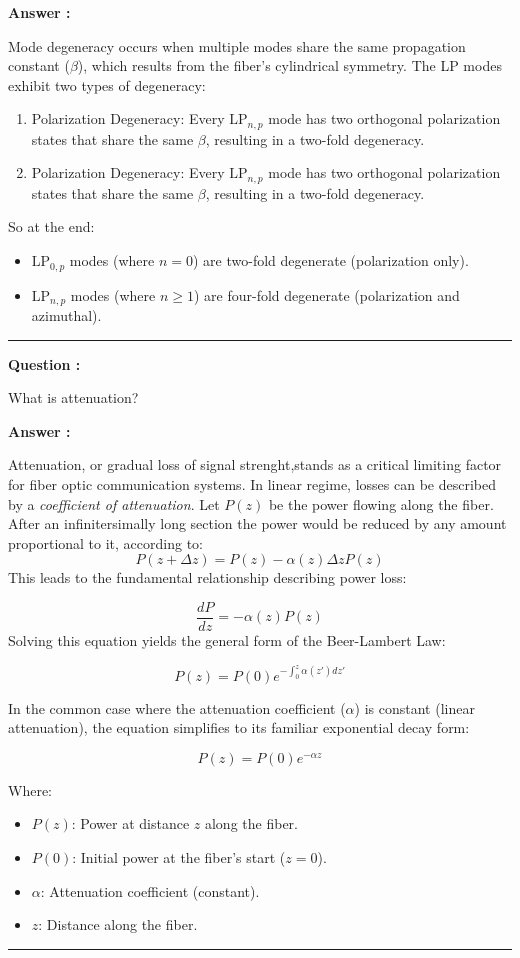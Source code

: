 \documentclass[a4paper,11pt]{book}
\newcounter{qacount}
\newenvironment{question}{
  \refstepcounter{qacount}
  \vspace{1em} %
  \noindent\textbf{Question \theqacount:}\space
}{
  \par %
}
\newenvironment{answer}{
  \noindent\textbf{Answer \theqacount:}\space
}{
  \par\vspace{1em}   %
  \hrule             %
  \vspace{0.5em}     %
}
\begin{document}
\begin{answer}
    Mode degeneracy occurs when multiple modes share the same propagation constant ($\beta$), which results from the fiber's cylindrical symmetry. The LP modes exhibit two types of degeneracy:

    \begin{enumerate}
        \item Polarization Degeneracy: Every $\text{LP}_{n,p}$ mode has two orthogonal polarization states that share the same $\beta$, resulting in a two-fold degeneracy.
        \item Polarization Degeneracy: Every $\text{LP}_{n,p}$ mode has two orthogonal polarization states that share the same $\beta$, resulting in a two-fold degeneracy.
    \end{enumerate}

    So at the end:
    \begin{itemize}
        \item $\text{LP}_{0,p}$ modes (where $n=0$) are two-fold degenerate (polarization only).
        \item $\text{LP}_{n,p}$ modes (where $n \geq 1$) are four-fold degenerate (polarization and azimuthal).
    \end{itemize}
\end{answer}

\begin{question}
    What is attenuation?
\end{question}

\begin{answer}
    Attenuation, or gradual loss of signal strenght,stands as a critical limiting factor for fiber optic communication systems. In linear regime, losses can be described by a \textit{coefficient of attenuation}. Let $P(z)$ be the power flowing along the fiber. After an infinitersimally long section the power would be reduced by any amount proportional to it, according to:
    $$P(z+\Delta z) = P(z) - \alpha(z)\Delta zP(z)$$
    This leads to the fundamental relationship describing power loss:

    $$\frac{dP}{dz}=-\alpha(z)P(z)$$
    Solving this equation yields the general form of the Beer-Lambert Law:

    $$P(z)=P(0) e^{-\int_{0}^{z}\alpha(z')dz'}$$

    In the common case where the attenuation coefficient ($\alpha$) is constant (linear attenuation), the equation simplifies to its familiar exponential decay form:

    $$P(z)=P(0) e^{-\alpha z}$$

    Where:
    \begin{itemize}
        \item $P(z)$: Power at distance $z$ along the fiber.
        \item $P(0)$: Initial power at the fiber's start ($z=0$).
        \item $\alpha$: Attenuation coefficient (constant).
        \item $z$: Distance along the fiber.
    \end{itemize}
\end{answer}
\end{document}

